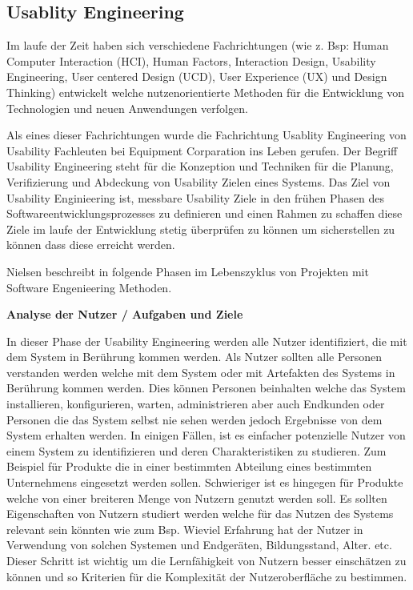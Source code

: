 
\subsection{Usablity Engineering}

\cite{MichaelRichter2016} Im laufe der Zeit haben sich verschiedene Fachrichtungen (wie z. Bsp: Human Computer Interaction (HCI), Human Factors, Interaction Design, Usability Engineering, 
User centered Design (UCD), User Experience (UX) und Design Thinking)  entwickelt welche nutzenorientierte Methoden für die Entwicklung von Technologien und neuen Anwendungen verfolgen. 

\cite{MaryBethRossonJohnM.CarrollDianeD.Cerra2002} Als eines dieser Fachrichtungen wurde die Fachrichtung Usablity Engineering von Usability Fachleuten bei Equipment Corparation ins Leben gerufen.  
Der Begriff Usability Engineering steht für die Konzeption und Techniken für die Planung, Verifizierung und Abdeckung von Usability Zielen eines Systems. Das Ziel von Usability Enginieering ist, 
messbare Usability Ziele in den frühen Phasen des Softwareentwicklungsprozesses zu definieren und einen Rahmen zu schaffen diese Ziele im laufe der Entwicklung stetig überprüfen zu können 
um sicherstellen zu können dass diese erreicht werden.

Nielsen beschreibt in \cite{Nielsen1994} folgende Phasen im Lebenszyklus von Projekten mit Software Engenieering Methoden.

\vspace{5mm}
\textbf{Analyse der Nutzer / Aufgaben und Ziele}  
 
In dieser Phase der Usability Engineering werden alle Nutzer identifiziert, die mit dem System in Berührung kommen werden. Als Nutzer sollten alle Personen verstanden werden welche mit dem 
System oder mit Artefakten des Systems in Berührung kommen werden. Dies können Personen beinhalten welche das System installieren, konfigurieren, warten, administrieren aber auch Endkunden oder 
Personen die das System selbst nie sehen werden jedoch Ergebnisse von dem System erhalten werden. In einigen Fällen, ist es einfacher potenzielle Nutzer von einem System zu identifizieren und deren 
Charakteristiken zu studieren. Zum Beispiel für Produkte die in einer bestimmten Abteilung eines bestimmten Unternehmens eingesetzt werden sollen. Schwieriger ist es hingegen für Produkte 
welche von einer breiteren Menge von Nutzern genutzt werden soll. Es sollten Eigenschaften von Nutzern studiert werden welche für das Nutzen des Systems relevant sein könnten wie zum Bsp. 
Wieviel Erfahrung  hat der Nutzer in Verwendung von solchen Systemen und Endgeräten, Bildungsstand, Alter. etc. Dieser Schritt ist wichtig um die Lernfähigkeit von Nutzern besser einschätzen zu 
können und so Kriterien für die Komplexität der Nutzeroberfläche zu bestimmen.

